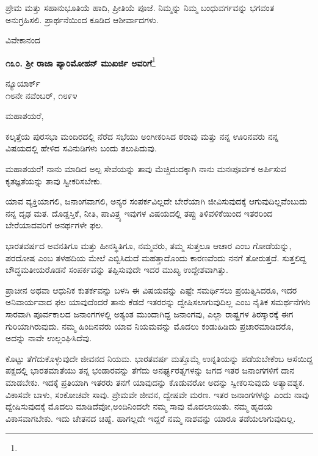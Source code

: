 ಪ್ರೇಮ ಮತ್ತು ಸಹಾನುಭೂತಿಯೆ ಹಾದಿ, ಪ್ರೀತಿಯೆ ಪೂಜೆ. ನಿಮ್ಮನ್ನು ನಿಮ್ಮ ಬಂಧುವರ್ಗವನ್ನು ಭಗವಂತ ಅನುಗ್ರಹಿಸಲಿ. ಪ್ರಾರ್ಥನೆಯಿಂದ ಕೂಡಿದ ಆಶೀರ್ವಾದಗಳು.

{\flushright
ವಿವೇಕಾನಂದ\par}

\begin{center}
\textbf{೧೩೦. ಶ‍್ರೀ ರಾಜಾ ಪ್ಯಾರಿಮೋಹನ್ ಮುಖರ್ಜಿ ಅವರಿಗೆ}\footnote{}
\end{center}

\begin{flushright}
ನ್ಯೂಯಾರ್ಕ್\\೧೮ನೇ ನವೆಂಬರ್, ೧೮೯೪
\end{flushright}

\noindent
ಮಹಾಶಯರೆ,

ಕಲ್ಕತ್ತೆಯ ಪುರಸಭಾ ಮಂದಿರದಲ್ಲಿ ನೆರೆದ ಸಭೆಯು ಅಂಗೀಕರಿಸಿದ ಠರಾವು ಮತ್ತು ನನ್ನ ಊರಿನವರು ನನ್ನ ವಿಷಯದಲ್ಲಿ ಹೇಳಿದ ಸವಿನುಡಿಗಳು ಬಂದು ತಲುಪಿದುವು.
\vspace{0.3cm}

ಮಹಾಶಯರೆ! ನಾನು ಮಾಡಿದ ಅಲ್ಪ ಸೇವೆಯನ್ನು ತಾವು ಮೆಚ್ಚಿದುದಕ್ಕಾಗಿ ನಾನು ಮನಃಪೂರ್ವಕ ಅರ್ಪಿಸುವ ಕೃತಜ್ಞತೆಯನ್ನು ತಾವು ಸ್ವೀಕರಿಸಬೇಕು.
\vspace{0.3cm}

ಯಾವ ವ್ಯಕ್ತಿಯಾಗಲಿ, ಜನಾಂಗವಾಗಲಿ, ಅನ್ಯರ ಸಂಪರ್ಕವಿಲ್ಲದೇ ಬೇರೆಯಾಗಿ ಜೀವಿಸುವುದಕ್ಕೆ ಆಗುವುದಿಲ್ಲವೆಂಬುದು ನನ್ನ ದೃಢ ಮತ. ದೊಡ್ಡಸ್ತಿಕೆ, ನೀತಿ, ಪಾವಿತ್ರ್ಯ ಇವುಗಳ ವಿಷಯದಲ್ಲಿ ತಪ್ಪು ತಿಳಿವಳಿಕೆಯಿಂದ ಇತರರಿಂದ ಬೇರೆಯಾದವರಿಗೆ ಅನರ್ಥಗಳೇ ಫಲ.
\vspace{0.3cm}

ಭಾರತವರ್ಷದ ಅವನತಿಗೂ ಮತ್ತು ಹೀನಸ್ಥಿತಿಗೂ, ನಮ್ಮವರು, ತಮ್ಮ ಸುತ್ತಲೂ ಆಚಾರ ಎಂಬ ಗೋಡೆಯನ್ನು, ಪರದೋಷ ಎಂಬ ತಳಹದಿಯ ಮೇಲೆ ಎಬ್ಬಿಸಿದುದೆ ಮಹತ್ತಾದೊಂದು ಕಾರಣವೆಂದು ನನಗೆ ತೋರುತ್ತದೆ. ಸುತ್ತಲಿದ್ದ ಬೌದ್ಧಮತೀಯರೊಡನೆ ಸಂಪರ್ಕವನ್ನು ತಪ್ಪಿಸುವುದೇ ಇದರ ಮುಖ್ಯ ಉದ್ದೇಶವಾಗಿತ್ತು.
\vspace{0.2cm}

ಪ್ರಾಚೀನ ಅಥವಾ ಆಧುನಿಕ ಕುತರ್ಕವನ್ನು ಬಳಸಿ ಈ ವಿಷಯವನ್ನು ಎಷ್ಟೇ ಸಮರ್ಥಿಸಲು ಪ್ರಯತ್ನಿಸಿದರೂ, ಇದರ ಅನಿವಾರ್ಯವಾದ ಫಲ ಯಾವುದೆಂದರೆ\enginline{-} ತಾನು ಕೆಡದೆ ಇತರರನ್ನು ದ್ವೇಷಿಸಲಾಗುವುದಿಲ್ಲ ಎಂಬ ನೈತಿಕ ಸಮರ್ಥನೆಗಳು ಸಾರವಾಗಿ\enginline{-} ಪೂರ್ವಕಾಲದ ಜನಾಂಗಗಳಲ್ಲಿ ಅತ್ಯಂತ ಮುಂದಾಗಿದ್ದ ಜನಾಂಗವು, ಎಲ್ಲಾ ರಾಷ್ಟ್ರಗಳ ತಿರಸ್ಕಾರಕ್ಕೆ ಈಗ ಗುರಿಯಾಗಿರುವುದು. ನಮ್ಮ ಹಿಂದಿನವರು ಯಾವ ನಿಯಮವನ್ನು ಮೊದಲು ಕಂಡುಹಿಡಿದು ಪ್ರಚಾರಮಾಡಿದರೊ, ಅದನ್ನು ನಾವೇ ಉಲ್ಲಂಘಿಸಿದೆವು.
\vspace{0.1cm}

ಕೊಟ್ಟು ತೆಗೆದುಕೊಳ್ಳುವುದೇ ಜೀವನದ ನಿಯಮ. ಭಾರತವರ್ಷ ಮತ್ತೊಮ್ಮೆ ಉನ್ನತಿಯನ್ನು ಪಡೆಯಬೇಕೆಂಬ ಆಸೆಯಿದ್ದ ಪಕ್ಷದಲ್ಲಿ ಭಾರತಮಾತೆಯು ತನ್ನ ಭಂಡಾರವನ್ನು ತೆಗೆದು ಅನರ್ಘ್ಯರತ್ನಗಳನ್ನು ಜಗದ ಇತರ ಜನಾಂಗಗಳಿಗೆ ದಾನ ಮಾಡಬೇಕು. ಇದಕ್ಕೆ ಪ್ರತಿಯಾಗಿ ಇತರರು ತನಗೆ ಯಾವುದನ್ನು ಕೊಡುವರೋ ಅದನ್ನು ಸ್ವೀಕರಿಸುವುದು ಅತ್ಯಾವಶ್ಯಕ. ವಿಕಾಸವೇ ಬಾಳು, ಸಂಕೋಚವೇ ಸಾವು. ಪ್ರೇಮವೇ ಜೀವನ, ದ್ವೇಷವೇ ಮರಣ. ಇತರ ಜನಾಂಗಗಳನ್ನು ಎಂದು ನಾವು ದ್ವೇಷಿಸುವುದಕ್ಕೆ ಮೊದಲು ಮಾಡಿದೆವೋ,\break ಅಂದಿನಿಂದಲೇ ನಮ್ಮ ಸಾವು ಮೊದಲಾಯಿತು. ನಮ್ಮ ಹೃದಯ ವಿಕಾಸವಾಗಬೇಕು. ಇದು ಚೇತನದ ಚಿಹ್ನೆ. ಹಾಗಲ್ಲದೇ ಇದ್ದರೆ ನಮ್ಮ ನಾಶವನ್ನು ಯಾರೂ ತಡೆಯಲಾಗುವುದಿಲ್ಲ.
\vspace{0.1cm}

